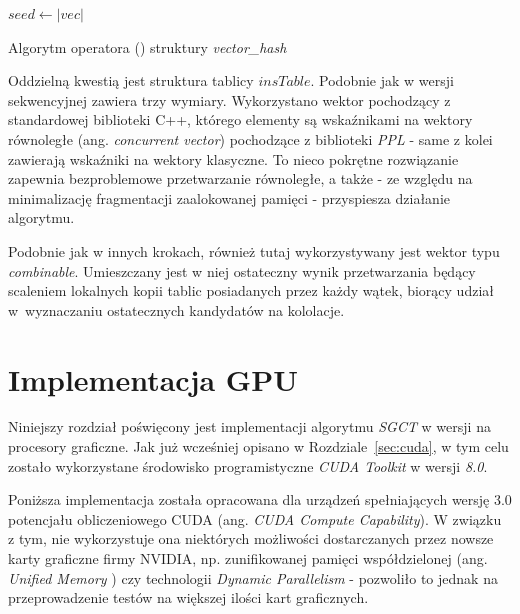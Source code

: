 \documentclass[12pt]{article}
\begin{document}
\begin{algorithm}
$ seed \leftarrow |vec| $\;
\caption{Algorytm operatora () struktury \textit{vector\_hash}}
\label{alg:vector_hash_combine}
\end{algorithm}

Oddzielną kwestią jest struktura tablicy $ insTable $. Podobnie jak w wersji sekwencyjnej zawiera trzy wymiary. Wykorzystano wektor pochodzący z standardowej biblioteki C++, którego elementy są wskaźnikami na wektory równoległe (ang. \textit{concurrent vector}) pochodzące z biblioteki \textit{PPL} - same z kolei zawierają wskaźniki na wektory klasyczne. To nieco pokrętne rozwiązanie zapewnia bezproblemowe przetwarzanie równoległe, a także - ze względu na minimalizację fragmentacji zaalokowanej pamięci - przyspiesza działanie algorytmu.

Podobnie jak w innych krokach, również tutaj wykorzystywany jest wektor typu \textit{combinable}. Umieszczany jest w niej ostateczny wynik przetwarzania będący scaleniem lokalnych kopii tablic posiadanych przez każdy wątek, biorący udział w~wyznaczaniu ostatecznych kandydatów na kololacje.

\newpage

\section{Implementacja GPU}
\label{sec:gpu}

Niniejszy rozdział poświęcony jest implementacji algorytmu \textit{SGCT} w wersji na procesory graficzne. Jak już wcześniej opisano w Rozdziale~\ref{sec:cuda}, w tym celu zostało wykorzystane środowisko programistyczne \textit{CUDA Toolkit} w wersji \textit{8.0}.

Poniższa implementacja została opracowana dla urządzeń spełniających wersję 3.0 potencjału obliczeniowego CUDA (ang.\textit{ CUDA Compute Capability}). W związku z tym, nie wykorzystuje ona niektórych możliwości dostarczanych przez nowsze karty graficzne firmy NVIDIA, np. zunifikowanej pamięci współdzielonej (ang. \textit{Unified Memory} \cite{cuda_um}) czy technologii \textit{Dynamic Parallelism} \cite{cuda_dp} - pozwoliło to jednak na przeprowadzenie testów na większej ilości kart graficznych.
\end{document}
